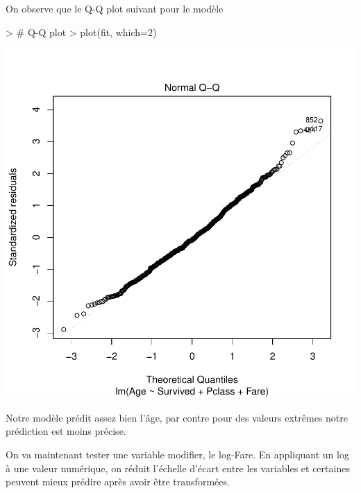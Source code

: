 \documentclass[11pt,french]{report}
\begin{document}
\bigskip
On observe que le Q-Q plot suivant pour le modèle

\begin{Schunk}
\begin{Sinput}
> # Q-Q plot 
> plot(fit, which=2)
\end{Sinput}
\end{Schunk}
\includegraphics{notes_de_cours-040}

\bigskip
Notre modèle prédit assez bien l'âge, par contre pour des valeurs extrêmes notre prédiction est moins précise. \newline

On va maintenant tester une variable modifier, le log-Fare. En appliquant un log à une valeur numérique, on réduit l'échelle d'écart entre les variables et certaines peuvent mieux prédire après avoir être transformées.
\end{document}
